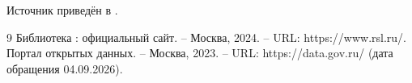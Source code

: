 Источник приведён в \cite{site}.

\begin{thebibliography}{9}
   Библиотека : официальный сайт. – Москва, 2024. –
  URL: https://www.rsl.ru/. %
   Портал открытых данных. – Москва, 2023. –
  URL: https://data.gov.ru/ (дата обращения 04.09.2026). %
\end{thebibliography}
